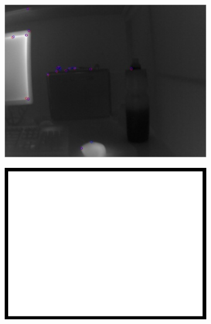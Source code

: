\begin{figure}
\begin{subfigure}{0.49\columnwidth}
    \includegraphics[width=1.00\textwidth]{media/V_C_highsnrcornersori.jpg}
    	\caption{}
		\label{fig:imgprocessing_5}
  \end{subfigure}
	\begin{subfigure}{0.49\columnwidth}
    \centering
    \includegraphics[width=1.00\textwidth]{media/dummy.jpg}
		\caption{}
		\label{fig:imgprocessing_6}
  \end{subfigure} \vspace{10pt} \\ 
	\begin{subfigure}{0.49\columnwidth}
    \centering

\end{subfigure}
\end{figure}
